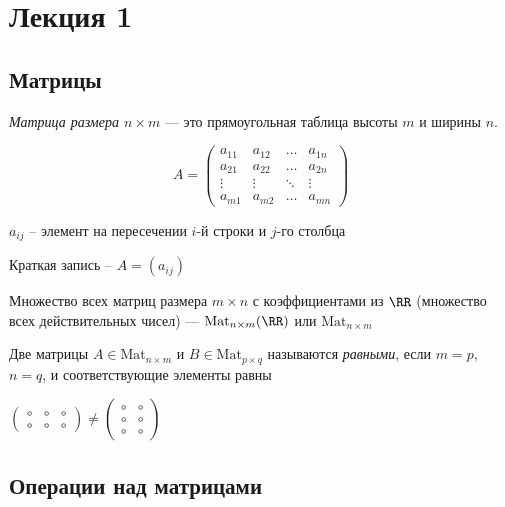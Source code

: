 \section{Лекция 1}
\subsection{Матрицы}
\begin{definition}
    \textit{Матрица размера $n \times m$} --- это прямоугольная таблица высоты $m$ и ширины $n$.
\end{definition}

\begin{equation*}
    A = \begin{pmatrix}
        a_{11}  & a_{12} & \dots & a_{1n} \\
        a_{21} & a_{22} & \dots & a_{2n} \\
        \vdots & \vdots & \ddots & \vdots \\
        a_{m1} & a_{m2} & \dots & a_{mn}
    \end{pmatrix}
\end{equation*}

$a_{ij}$ -- элемент на пересечении $i$-й строки и $j$-го столбца

Краткая запись -- $A = (a_{ij})$

Множество всех матриц размера $m \times n$ с коэффициентами из $\RR$ (множество всех действительных чисел) --- $\text{Mat}_{n \times m}(\RR)$ или $\text{Mat}_{n \times m}$

\begin{definition}
    Две матрицы $A \in \text{Mat}_{n \times m}$ и $B \in \text{Mat}_{p \times q}$ называются \textit{равными}, если $m = p$, $n = q$, и соответствующие элементы равны
\end{definition}

\begin{example}
    $\begin{pmatrix}
       \circ & \circ & \circ \\ \circ & \circ & \circ
    \end{pmatrix}
    \neq
    \begin{pmatrix}
        \circ & \circ \\ \circ & \circ \\ \circ & \circ
    \end{pmatrix}$
\end{example}

\subsection{Операции над матрицами}

